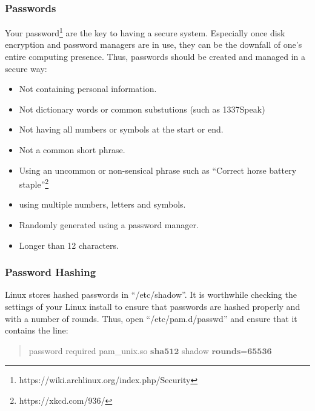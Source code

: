 \documentclass[a4paper,11pt]{report}
\begin{document}
		\subsubsection{Passwords} 
			Your password\footnote{https://wiki.archlinux.org/index.php/Security} are the key to having a secure system. 
			Especially once disk encryption and password managers are in use, they can be the downfall of one's entire computing presence. 
			Thus, passwords should be created and managed in a secure way:
			\begin{itemize}
				\item Not containing personal information.
				\item Not dictionary words or common substutions (such as 1337Speak)
				\item Not having all numbers or symbols at the start or end. 
				\item Not a common short phrase. 
				\item Using an uncommon or non-sensical phrase such as ``Correct horse battery staple''\footnote{https://xkcd.com/936/}
				\item using multiple numbers, letters and symbols. 
				\item Randomly generated using a password manager. %
				\item Longer than 12 characters. 
			\end{itemize}
		\subsubsection{Password Hashing}
			Linux stores hashed passwords in ``/etc/shadow''. 
			It is worthwhile checking the settings of your Linux install to ensure that passwords are hashed properly and with a number of rounds. Thus, open ``/etc/pam.d/passwd'' and ensure that it contains the line:
			\begin{quote}
				password required pam\_unix.so $\textbf{sha512}$ shadow $\textbf{rounds=65536}$
			\end{quote}
\end{document}

